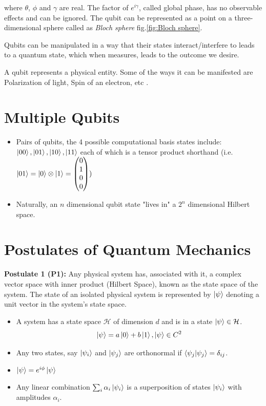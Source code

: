 \documentclass[11.5pt, paper=a4]{article}
\theoremstyle{definition}
\numberwithin{theorem}{section}
\begin{document}
where $\theta$, $\phi$ and $\gamma$ are real. The factor of $e^{i\gamma}$, called global phase, has no observable effects and can be ignored. The qubit can be represented as a point on a three-dimensional sphere called as \textit{Bloch sphere} fig.\ref{fig:Bloch sphere}.

Qubits can be manipulated in a way that their states interact/interfere to leads to a quantum state, which when measures, leads to the outcome we desire.

A qubit represents a physical entity. Some of the ways it can be manifested are Polarization of light, Spin of an electron, etc \cite{physical_qubits}.


\section{Multiple Qubits}
\begin{itemize}
    \item Pairs of qubits, the 4 possible computational basis states include: $\ket{00}, \ket{01}, \ket{10}, \ket{11}$ each of which is a tensor product shorthand (i.e. $\ket{01} = \ket{0} \otimes \ket{1} =
    \begin{pmatrix}
    0 \\
    1 \\
    0 \\
    0
    \end{pmatrix}) $
    \item Naturally, an $n$ dimensional qubit state "lives in" a $2^n$ dimensional Hilbert space.
\end{itemize}


\section{Postulates of Quantum Mechanics}
\textbf{Postulate 1 (P1):} Any physical system has, associated with it, a complex vector space with inner product (Hilbert Space), known as the state space of the system. The state of an isolated physical system is represented by $\ket{\psi}$ denoting a unit vector in the system's state space.
\begin{itemize}
    \item A system has a state space $\mathcal{H}$ of dimension $d$ and is in a state $\ket{\psi} \in \mathcal{H}$.
    \begin{equation*}
        \ket{\psi} = a\ket{0} + b\ket{1}, \ket{\psi} \in C^2
    \end{equation*}
    \item Any two states, say $\ket{\psi_i}$ and $\ket{\psi_j}$ are orthonormal if $\braket{\psi_j|\psi_j} = \delta_{ij}$.
    \item $\ket{\psi} = e^{i\phi} \ket{\psi}$
    \item Any linear combination $\sum_i \alpha_i \ket{\psi_i}$ is a superposition of states $\ket{\psi_i}$ with amplitudes $\alpha_i$.
\end{itemize}
\end{document}
